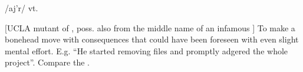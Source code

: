  /aj'r/ vt.

[UCLA mutant of , poss. also from the middle name of an infamous ] To make a bonehead
move with consequences that could have been foreseen with even slight mental effort. E.g. ``He started removing files and promptly adgered
the whole project''. Compare the .

